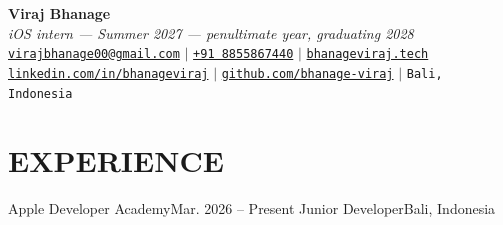 


\begin{center}
    \textbf{\Huge Viraj Bhanage} \\ \vspace{4pt}
    {\small\textit{iOS intern --- Summer 2027 --- penultimate year, graduating 2028}} \\ \vspace{4pt}
    \small
    \faEnvelope \hspace{2pt} \href{mailto:virajbhanage00@gmail.com}{\texttt{virajbhanage00@gmail.com}} \hspace{1pt} $|$
    \hspace{1pt} \faPhone \hspace{2pt} \href{tel:+918855867440}{\texttt{+91 8855867440}} \hspace{1pt} $|$
    \hspace{1pt} \href{https://www.bhanageviraj.tech}{\texttt{bhanageviraj.tech}} \\
    \faLinkedin \hspace{2pt} \href{https://www.linkedin.com/in/bhanageviraj/}{\texttt{linkedin.com/in/bhanageviraj}} \hspace{1pt} $|$
    \hspace{1pt} \faGithub \hspace{2pt} \href{https://github.com/bhanage-viraj}{\texttt{github.com/bhanage-viraj}} \hspace{1pt} $|$
    \hspace{1pt} \faMapMarker* \hspace{2pt}\texttt{Bali, Indonesia}
\end{center}

\section{EXPERIENCE}
  \resumeSubHeadingListStart
    \resumeSubheading
      {Apple Developer Academy}{Mar. 2026 -- Present}
      {Junior Developer}{Bali, Indonesia}
      \resumeItemListStart
      \resumeItemListEnd
  \resumeSubHeadingListEnd

